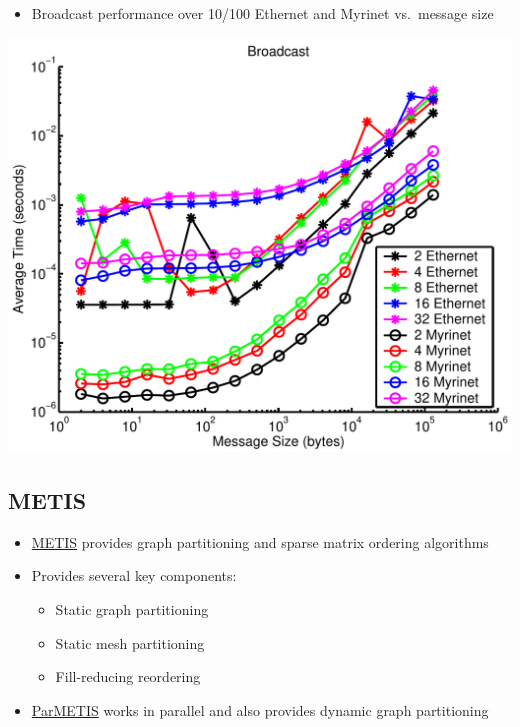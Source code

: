 \documentclass[compress,12pt]{beamer}
\begin{document}
\begin{frame}%
  \begin{itemize}
    \item Broadcast performance over 10/100 Ethernet and Myrinet vs.\ message size
  \end{itemize}
  \begin{center}
    \includegraphics[width=.7\textwidth]{figures/perf_broadcast}
  \end{center}
\end{frame}


\subsection{METIS}
\begin{frame}%
  \begin{itemize}
    \item \href{http://www-users.cs.umn.edu/~karypis/metis/}{METIS} provides graph partitioning and sparse matrix ordering algorithms
    \item Provides several key components:
      \begin{itemize}
        \item Static graph partitioning
        \item Static mesh partitioning
        \item Fill-reducing reordering
      \end{itemize}
    \item \href{http://www-users.cs.umn.edu/~karypis/metis/}{ParMETIS} works in parallel and also provides dynamic graph partitioning
  \end{itemize}
\end{frame}
\end{document}
